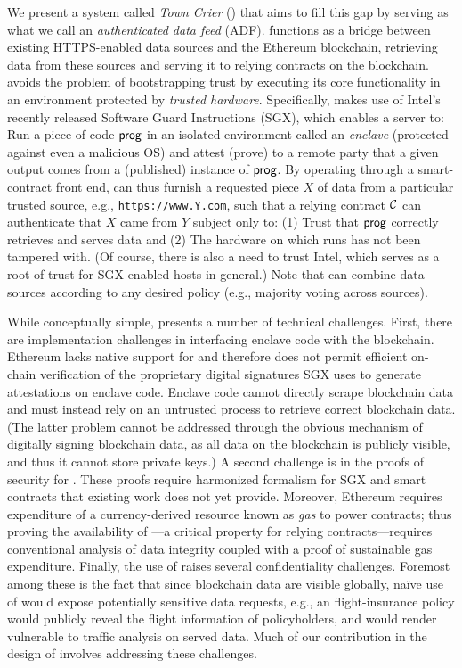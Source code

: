 We present a system called \emph{Town Crier} (\tc) that aims to fill this gap by serving as what we call an \emph{authenticated data feed} (ADF). \tc functions as a bridge between existing HTTPS-enabled data sources and the Ethereum blockchain, retrieving data from these sources and serving it to relying contracts on the blockchain. \tc avoids the problem of bootstrapping trust by executing its core functionality in an environment protected by \emph{trusted hardware}. Specifically, \tc makes use of Intel's recently released Software Guard Instructions (SGX), which enables a server to: Run a piece of code ${\sf prog}$ in an isolated environment called an \emph{enclave} (protected against even a malicious OS) and attest (prove) to a remote party that a given output comes from a (published) instance of ${\sf prog}$. By operating through a smart-contract front end, \tc can thus furnish a requested piece $X$ of data from a particular trusted source, e.g., \texttt{https://www.Y.com}, such that a relying contract ${\cal C}$ can authenticate that $X$ came from $Y$ subject only to: (1) Trust that ${\sf prog}$ correctly retrieves and serves data and (2) The hardware on which \tc runs has not been tampered with. (Of course, there is also a need to trust Intel, which serves as a root of trust for SGX-enabled hosts in general.) Note that \tc can combine data sources according to any desired policy (e.g., majority voting across sources).

While conceptually simple, \tc presents a number of technical challenges. First, there are implementation challenges in interfacing enclave code with the blockchain. Ethereum lacks native support for and therefore does not permit efficient on-chain verification of the proprietary digital signatures SGX uses to generate attestations on enclave code. Enclave code cannot directly scrape blockchain data and must instead rely on an untrusted process to retrieve correct blockchain data. (The latter problem cannot be addressed through the obvious mechanism of digitally signing blockchain data, as all data on the blockchain is publicly visible, and thus it cannot store private keys.) A second challenge is in the proofs of security for \tc. These proofs require harmonized formalism for SGX and smart contracts that existing work does not yet provide. Moreover, Ethereum requires expenditure of a currency-derived resource known as \emph{gas} to power contracts; thus proving the availability of \tc---a critical property for relying contracts---requires conventional analysis of data integrity coupled with a proof of sustainable gas expenditure. Finally, the use of \tc raises several confidentiality challenges. Foremost among these is the fact that since blockchain data are visible globally, na\"{i}ve use of \tc would expose potentially sensitive data requests, e.g., an flight-insurance policy would publicly reveal the flight information of policyholders, and would render \tc vulnerable to traffic analysis on served data. Much of our contribution in the design of \tc involves addressing these challenges. 

